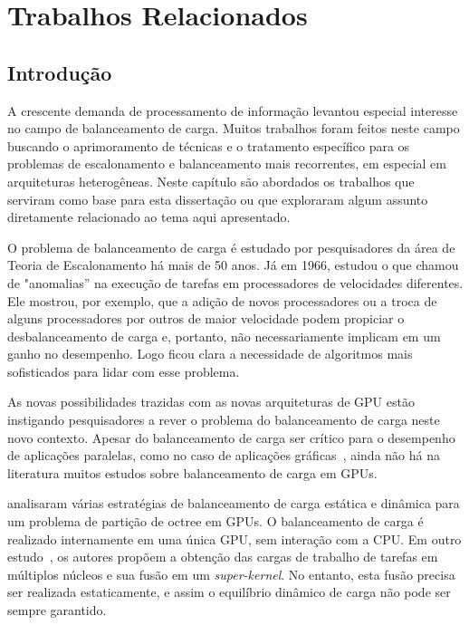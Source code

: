 \pagestyle{empty}
\cleardoublepage
\pagestyle{fancy}
\chapter{Trabalhos Relacionados}\label{cap2}

\section{Introdução}\label{cap2:intro}


A crescente demanda de processamento de informação levantou especial interesse no campo de balanceamento de carga. Muitos trabalhos foram feitos neste campo buscando o aprimoramento de técnicas e o tratamento específico para os problemas de escalonamento e balanceamento mais recorrentes, em especial em arquiteturas heterogêneas. Neste capítulo são abordados os trabalhos que serviram como base para esta dissertação ou que exploraram algum assunto diretamente relacionado ao tema aqui apresentado. 

O problema de balanceamento de carga é estudado por pesquisadores da
área de Teoria de Escalonamento há mais de 50 anos. Já em 1966,
\citep{graham66} estudou o que chamou de "anomalias'' na execução de
tarefas em processadores de velocidades diferentes. Ele mostrou, por
exemplo, que a adição de novos processadores ou a troca de alguns
processadores por outros de maior velocidade podem propiciar o
desbalanceamento de carga e, portanto, não necessariamente implicam em
um ganho no desempenho. Logo ficou clara a necessidade de algoritmos
mais sofisticados para lidar com esse problema. 

As novas possibilidades trazidas com as novas arquiteturas de GPU
estão instigando pesquisadores a rever o problema do balanceamento de
carga neste novo contexto.
Apesar do balanceamento de carga ser
crítico para o desempenho de aplicações paralelas, como no caso de
aplicações gráficas~\citep{kdtree, ray}, ainda não há na literatura muitos
estudos sobre balanceamento de carga em GPUs.

\citep{graphics} analisaram várias estratégias de balanceamento de carga estática
e dinâmica para um problema de partição de octree em GPUs. O balanceamento de
carga é realizado internamente em uma única GPU, sem interação com a CPU. Em
outro estudo~\citep{tasks}, os autores propõem a obtenção das cargas de trabalho
de tarefas em múltiplos núcleos e sua fusão em um \textit{super-kernel}. No
entanto, esta fusão precisa ser realizada estaticamente, e assim o equilíbrio
dinâmico de carga não pode ser sempre garantido.

